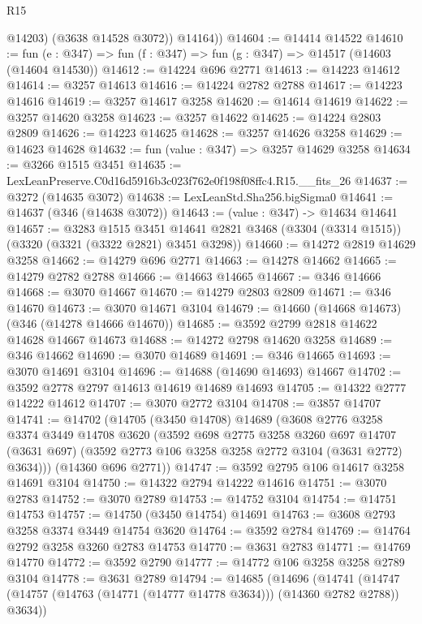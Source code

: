 \begin{lexlean}{R15}
\begin{coremodule}
            @14203)
          (@3638 @14528 @3072))
        @14164))
@14604 := @14414 @14522
@14610 := fun (e : @347) => fun (f : @347) => fun (g : @347) => @14517 (@14603 (@14604 @14530))
@14612 := @14224 @696 @2771
@14613 := @14223 @14612
@14614 := @3257 @14613
@14616 := @14224 @2782 @2788
@14617 := @14223 @14616
@14619 := @3257 @14617 @3258
@14620 := @14614 @14619
@14622 := @3257 @14620 @3258
@14623 := @3257 @14622
@14625 := @14224 @2803 @2809
@14626 := @14223 @14625
@14628 := @3257 @14626 @3258
@14629 := @14623 @14628
@14632 := fun (value : @347) => @3257 @14629 @3258
@14634 := @3266 @1515 @3451
@14635 := LexLeanPreserve.C0d16d5916b3c023f762e0f198f08ffc4.R15.__fits_26
@14637 := @3272 (@14635 @3072)
@14638 := LexLeanStd.Sha256.bigSigma0
@14641 := @14637 (@346 (@14638 @3072))
@14643 := (value : @347) -> @14634 @14641
@14657 := @3283
    @1515
    @3451
    @14641
    @2821
    @3468
    (@3304 (@3314 @1515))
    (@3320 (@3321 (@3322 @2821) @3451 @3298))
@14660 := @14272 @2819 @14629 @3258
@14662 := @14279 @696 @2771
@14663 := @14278 @14662
@14665 := @14279 @2782 @2788
@14666 := @14663 @14665
@14667 := @346 @14666
@14668 := @3070 @14667
@14670 := @14279 @2803 @2809
@14671 := @346 @14670
@14673 := @3070 @14671 @3104
@14679 := @14660 (@14668 @14673) (@346 (@14278 @14666 @14670))
@14685 := @3592 @2799 @2818 @14622 @14628 @14667 @14673
@14688 := @14272 @2798 @14620 @3258
@14689 := @346 @14662
@14690 := @3070 @14689
@14691 := @346 @14665
@14693 := @3070 @14691 @3104
@14696 := @14688 (@14690 @14693) @14667
@14702 := @3592 @2778 @2797 @14613 @14619 @14689 @14693
@14705 := @14322 @2777 @14222 @14612
@14707 := @3070 @2772 @3104
@14708 := @3857 @14707
@14741 := @14702
    (@14705
      (@3450 @14708)
      @14689
      (@3608
        @2776
        @3258
        @3374
        @3449
        @14708
        @3620
        (@3592
          @698
          @2775
          @3258
          @3260
          @697
          @14707
          (@3631 @697)
          (@3592 @2773 @106 @3258 @3258 @2772 @3104 (@3631 @2772) @3634)))
      (@14360 @696 @2771))
@14747 := @3592 @2795 @106 @14617 @3258 @14691 @3104
@14750 := @14322 @2794 @14222 @14616
@14751 := @3070 @2783
@14752 := @3070 @2789
@14753 := @14752 @3104
@14754 := @14751 @14753
@14757 := @14750 (@3450 @14754) @14691
@14763 := @3608 @2793 @3258 @3374 @3449 @14754 @3620
@14764 := @3592 @2784
@14769 := @14764 @2792 @3258 @3260 @2783 @14753
@14770 := @3631 @2783
@14771 := @14769 @14770
@14772 := @3592 @2790
@14777 := @14772 @106 @3258 @3258 @2789 @3104
@14778 := @3631 @2789
@14794 := @14685
    (@14696
      (@14741 (@14747 (@14757 (@14763 (@14771 (@14777 @14778 @3634))) (@14360 @2782 @2788)) @3634))

\end{coremodule}
\end{lexlean}
